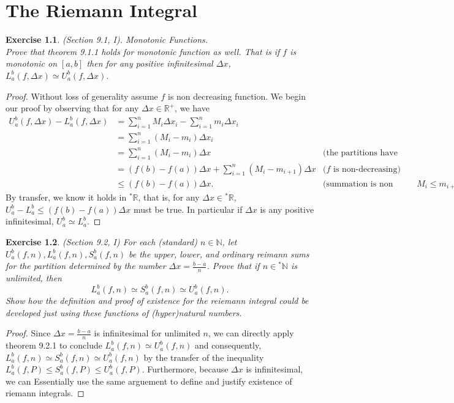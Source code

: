 \documentclass[a4paper, 11pt, openany]{book}
\theoremstyle{plain}
\newtheorem{exercise}{Exercise}[chapter]
\theoremstyle{plain}
\newcommand{\N}{\mathbb{N}}
\newcommand{\R}{\mathbb{R}}
\newcommand{\hyp}{{}^*}
\newcommand{\Del}{\Delta}
\begin{document}
\chapter{The Riemann Integral}
    \begin{exercise}
      (Section 9.1, I). Monotonic Functions. \\
      Prove that theorem 9.1.1 holds for monotonic function as well. That is if $f$ is monotonic on $[a,b]$ then for any positive infinitesimal $\Del x$, $L_a^b (f, \Del x) \simeq U_a^b (f, \Del x)$.
    \end{exercise}
    \begin{proof}
      Without loss of generality assume $f$ is non decreasing function. We begin our proof by observing that for any $\Del x \in \R^+$, we have 
      \begin{align*}
        U_a^b (f, \Del x)-L_a^b (f, \Del x) &= \sum_{i=1}^n M_i \Del x_i-\sum_{i=1}^n m_i \Del x_i \\
        &= \sum_{i=1}^n (M_i-m_i) \Del x_i \\
        &= \sum_{i=1}^n (M_i-m_i) \Del x &\text{(the partitions have equal width)} \\
        &= (f(b)-f(a)) \Del x+\sum_{i=1}^n (M_i-m_{i+1}) \Del x & \text{($f$ is non-decreasing)} \\
        &\leq (f(b)-f(a)) \Del x. & \text{(summation is non positive since $M_i \leq m_{i+1}$)}
      \end{align*}
      By transfer, we know it holds in $\hyp \R$, that is, for any $\Del x \in \hyp \R$, $U_a^b-L_a^b \leq (f(b)-f(a)) \Del x$ must be true. In particular if $\Del x$ is any positive infinitesimal, $U_a^b \simeq L_a^b$.
    \end{proof}

    \begin{exercise}
      (Section 9.2, I) 
      For each (standard) $n \in \N$, let $U_a^b (f,n), L_a^b (f,n), S_a^b (f,n)$ be the upper, lower, and ordinary reimann sums for the partition determined by the number $\Del x=\frac{b-a}{n}$. Prove that if $n \in \hyp \N$ is unlimited, then $$L_a^b (f,n) \simeq S_a^b (f,n) \simeq U_a^b (f,n).$$ Show how the definition and proof of existence for the reiemann integral could be developed just using these functions of (hyper)natural numbers.
    \end{exercise}
    \begin{proof}
      Since $\Del x=\frac{b-a}{n}$ is infinitesimal for unlimited $n$, we can directly apply theorem 9.2.1 to conclude $L_a^b (f,n) \simeq U_a^b (f,n)$ and consequently, $L_a^b (f,n) \simeq S_a^b (f,n) \simeq U_a^b (f,n)$ by the transfer of the inequality $L_a^b (f,P) \leq S_a^b (f,P) \leq U_a^b (f, P)$. Furthermore, because $\Del x$ is infinitesimal, we can Essentially use the same arguement to define and justify existence of riemann integrals.
    \end{proof}
\end{document}
